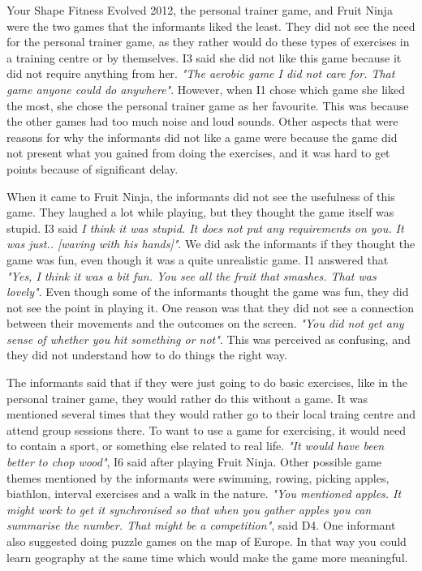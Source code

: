 Your Shape Fitness Evolved 2012, the personal trainer game, and Fruit Ninja were the two games that the informants liked the least. They did not see the need for the personal trainer game, as they rather would do these types of exercises in a training centre or by themselves. I3 said she did not like this game because it did not require anything from her. \emph{"The aerobic game I did not care for. That game anyone could do anywhere"}. However, when I1 chose which game she liked the most, she chose the personal trainer game as her favourite. This was because the other games had too much noise and loud sounds. Other aspects that were reasons for why the informants did not like a game were because the game did not present what you gained from doing the exercises, and it was hard to get points because of significant delay. 

When it came to Fruit Ninja, the informants did not see the usefulness of this game. They laughed a lot while playing, but they thought the game itself was stupid. I3 said \emph{I think it was stupid. It does not put any requirements on you. It was just.. [waving with his hands]"}. We did ask the informants if they thought the game was fun, even though it was a quite unrealistic game. I1 answered that \emph{"Yes, I think it was a bit fun. You see all the fruit that smashes. That was lovely"}. Even though some of the informants thought the game was fun, they did not see the point in playing it. One reason was that they did not see a connection between their movements and the outcomes on the screen. \emph{"You did not get any sense of whether you hit something or not"}. This was perceived as confusing, and they did not understand how to do things the right way. 

The informants said that if they were just going to do basic exercises, like in the personal trainer game, they would rather do this without a game. It was mentioned several times that they would rather go to their local traing centre and attend group sessions there. To want to use a game for exercising, it would need to contain a sport, or something else related to real life. \emph{"It would have been better to chop wood"}, I6 said after playing Fruit Ninja. Other possible game themes mentioned by the informants were swimming, rowing, picking apples, biathlon, interval exercises and a walk in the nature. \emph{"You mentioned apples. It might work to get it synchronised so that when you gather apples you can summarise the number. That might be a competition"}, said D4. One informant also suggested doing puzzle games on the map of Europe. In that way you could learn geography at the same time which would make the game more meaningful.

